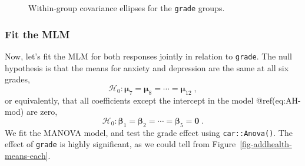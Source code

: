 \documentclass[
  letterpaper,
  10pt,
  krantz2]{krantz}
\begin{document}
\begin{figure}


\caption{\label{fig-addhealth-covellipse}Within-group covariance
ellipses for the \texttt{grade} groups.}

\end{figure}%

\subsubsection*{Fit the MLM}\label{fit-the-mlm}

Now, let's fit the MLM for both responses jointly in relation to
\texttt{grade}. The null hypothesis is that the means for anxiety and
depression are the same at all six grades, \[
\mathcal{H}_0: \mathbf{\mu}_7 = \mathbf{\mu}_8 = \cdots = \mathbf{\mu}_{12} \; ,
\] or equivalently, that all coefficients except the intercept in the
model @ref(eq:AH-mod) are zero, \[
\mathcal{H}_0: \boldsymbol{\beta}_1 =  \boldsymbol{\beta}_2  = \cdots =  \boldsymbol{\beta}_5 = \boldsymbol{0} \; .
\] We fit the MANOVA model, and test the grade effect using
\texttt{car::Anova()}. The effect of \texttt{grade} is highly
significant, as we could tell from
Figure~\ref{fig-addhealth-means-each}.
\end{document}
